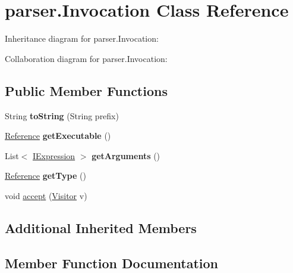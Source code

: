 \hypertarget{classparser_1_1_invocation}{}\section{parser.\+Invocation Class Reference}
\label{classparser_1_1_invocation}


Inheritance diagram for parser.\+Invocation\+:


Collaboration diagram for parser.\+Invocation\+:
\subsection*{Public Member Functions}
\begin{DoxyCompactItemize}
\item 
String {\bfseries to\+String} (String prefix)\hypertarget{classparser_1_1_invocation_a0d768686d5909bec9d89031a929c4b4b}{}\label{classparser_1_1_invocation_a0d768686d5909bec9d89031a929c4b4b}

\item 
\hyperlink{classparser_1_1_reference}{Reference} {\bfseries get\+Executable} ()\hypertarget{classparser_1_1_invocation_af4acf1569a34a9ccfeac7595f4735982}{}\label{classparser_1_1_invocation_af4acf1569a34a9ccfeac7595f4735982}

\item 
List$<$ \hyperlink{interfaceparser_1_1_i_expression}{I\+Expression} $>$ {\bfseries get\+Arguments} ()\hypertarget{classparser_1_1_invocation_ae563a8071a94fa5a1c19b56802319af0}{}\label{classparser_1_1_invocation_ae563a8071a94fa5a1c19b56802319af0}

\item 
\hyperlink{classparser_1_1_reference}{Reference} {\bfseries get\+Type} ()\hypertarget{classparser_1_1_invocation_a69ae220eee81b07dd759e1b0ae096ad3}{}\label{classparser_1_1_invocation_a69ae220eee81b07dd759e1b0ae096ad3}

\item 
void \hyperlink{classparser_1_1_invocation_a75b903a5e13378cba9f5d5c3f7db474a}{accept} (\hyperlink{interfacemain_1_1_visitor}{Visitor} v)
\end{DoxyCompactItemize}
\subsection*{Additional Inherited Members}


\subsection{Member Function Documentation}
